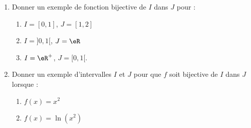 
\begin{exercice}\label{exoanalyseCTU-0023}

\begin{enumerate}
\item Donner un exemple de fonction bijective de $I$ dans $J$ pour :

    \begin{enumerate}
        \item
            
 $I=[0,1]$, $J=[1,2]$\hspace*{1.5cm} 
 \item
 $I=]0,1[$, $J=\eR$\hspace*{1.5cm} 
 \item
 $I=\eR^+$, $J=[0,1[$.
    \end{enumerate}
\item Donner un exemple d'intervalles $I$ et $J$ pour que $f$ soit  bijective de $I$ dans $J$ lorsque : 

    \begin{enumerate}
        \item
 $f(x)=x^2$\hspace*{1.5cm} 
 \item
 $f(x)=\ln(x^2)$\hspace*{1.5cm} 
    \end{enumerate}
\end{enumerate}

\end{exercice}
